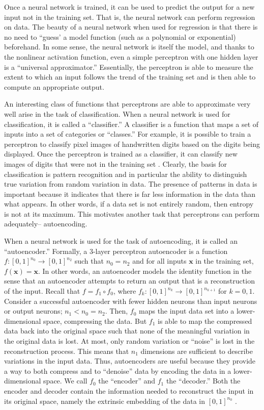 \documentclass[12pt]{article}
\newcommand{\vecx}{\mathbf{x}}
\begin{document}
Once a neural network is trained, it can be used to predict the output for a new input not in the training set. That is, the neural network can perform regression on data. The beauty of a neural network when used for regression is that there is no need to ``guess' a model function (such as a polynomial or exponential) beforehand. In some sense, the neural network is itself the model, and thanks to the nonlinear activation function, even a simple perceptron with one hidden layer is a ``universal approximator.'' Essentially, the perceptron is able to measure the extent to which an input follows the trend of the training set and is then able to compute an appropriate output.

An interesting class of functions that perceptrons are able to approximate very well arise in the task of classification. When a neural network is used for classification, it is called a ``classifier.'' A classifier is a function that maps a set of inputs into a set of categories or ``classes.'' For example, it is possible to train a perceptron to classify pixel images of handwritten digits based on the digits being displayed. Once the perceptron is trained as a classifier, it can classify new images of digits that were not in the training set \cite{classifier}. Clearly, the basis for classification is pattern recognition and in particular the ability to distinguish true variation from random variation in data. The presence of patterns in data is important because it indicates that there is far less information in the data than what appears. In other words, if a data set is not entirely random, then entropy is not at its maximum. This motivates another task that perceptrons can perform adequately-- autoencoding.

When a neural network is used for the task of autoencoding, it is called an ``autoencoder.'' Formally, a 3-layer perceptron autoencoder is a function $f:[0,1]^{n_0}\to [0,1]^{n_2}$ such that $n_0=n_2$ and for all inputs $\vecx$ in the training set, $f(\vecx) = \vecx$. In other words, an autoencoder models the identity function in the sense that an autoencoder attempts to return an output that is a reconstruction of the input. Recall that $f = f_1\circ f_0$, where $f_k:[0,1]^{n_k}\to [0,1]^{n_{k+1}}$ for $k=0,1$. Consider a successful autoencoder with fewer hidden neurons than input neurons or output neurons; $n_1 < n_0 = n_2$. Then, $f_0$ maps the input data set into a lower-dimensional space, compressing the data. But $f_1$ is able to map the compressed data back into the original space such that none of the meaningful variation in the original data is lost. At most, only random variation or ``noise'' is lost in the reconstruction process. This means that $n_1$ dimensions are sufficient to describe variations in the input data. Thus, autoencoders are useful because they provide a way to both compress and to ``denoise'' data by encoding the data in a lower-dimensional space. We call $f_0$ the ``encoder'' and $f_1$ the ``decoder.'' Both the encoder and decoder contain the information needed to reconstruct the input in its original space, namely the extrinsic embedding of the data in $[0,1]^{n_0}$ \cite{autoencoder}.
\end{document}
